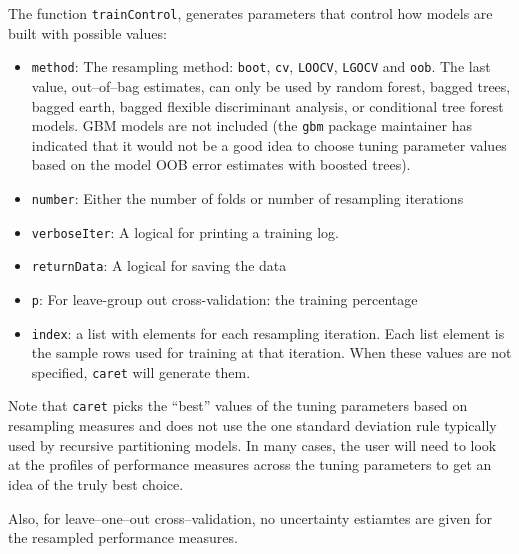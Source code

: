 \documentclass[12pt]{article}
\begin{document}
The function \texttt{trainControl}, generates parameters that control how models are built with possible values:
\begin{itemize}
   \item \texttt{method}: The resampling method: \texttt{boot}, \texttt{cv}, \texttt{LOOCV}, \texttt{LGOCV}  and \texttt{oob}. The last value, out--of--bag estimates, can only be used by random forest, bagged trees, bagged earth, bagged flexible discriminant analysis, or conditional tree forest models. GBM models are not included (the \texttt{gbm} package maintainer has indicated that it would not be a good idea to choose tuning parameter values based on the model OOB error estimates with boosted trees).
   \item \texttt{number}: Either the number of folds or number of resampling iterations
   \item \texttt{verboseIter}: A logical for printing a training log.
   \item \texttt{returnData}: A logical for saving the data
   \item \texttt{p}: For leave-group out cross-validation: the training percentage
   \item \texttt{index}: a list with elements for each resampling iteration. Each list element is the sample rows used for training at that iteration. When these values are not specified, \texttt{caret} will generate them.
\end{itemize}

Note that \texttt{caret} picks the ``best'' values of the tuning parameters based on resampling measures and does not use the one standard deviation rule typically used by recursive partitioning models. In many cases, the user will need to look at the profiles of performance measures across the tuning parameters to get an idea of the truly best choice.

Also, for leave--one--out cross--validation, no uncertainty estiamtes are given for the resampled performance measures.
\end{document}
